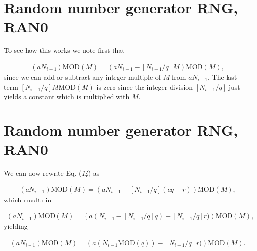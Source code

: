 \documentclass[letterpaper,10pt,english]{sphinxmanual}
\begin{document}
\section{Random number generator RNG, RAN0}
\label{\detokenize{chapter3:id10}}
To see how this works we note first that




\begin{equation*}
\begin{split}
\begin{equation}
(aN_{i-1}) \mathrm{MOD} (M)= (aN_{i-1}-[N_{i-1}/q]M)\mathrm{MOD} (M),
\label{eq:rntrick1} \tag{14}
\end{equation}
\end{split}
\end{equation*}
since we can add or subtract any integer multiple of \(M\) from \(aN_{i-1}\).
The last term \([N_{i-1}/q]M\mathrm{MOD}(M)\) is zero since the integer division
\([N_{i-1}/q]\) just yields a constant which is multiplied with \(M\).


\section{Random number generator RNG, RAN0}
\label{\detokenize{chapter3:id11}}
We can now rewrite Eq. ({\hyperref[\detokenize{chapter3:eq:rntrick1}]{\emph{14}}}) as




\begin{equation*}
\begin{split}
\begin{equation}
(aN_{i-1}) \mathrm{MOD} (M)= (aN_{i-1}-[N_{i-1}/q](aq+r))\mathrm{MOD} (M),
\label{eq:rntrick2} \tag{15}
\end{equation}
\end{split}
\end{equation*}
which results
in




\begin{equation*}
\begin{split}
\begin{equation}
(aN_{i-1}) \mathrm{MOD} (M)= \left(a(N_{i-1}-[N_{i-1}/q]q)-[N_{i-1}/q]r)\right)\mathrm{MOD} (M),
\label{eq:rntrick3} \tag{16}
\end{equation}
\end{split}
\end{equation*}
yielding




\begin{equation*}
\begin{split}
\begin{equation}
(aN_{i-1}) \mathrm{MOD} (M)= \left(a(N_{i-1}\mathrm{MOD} (q)) -[N_{i-1}/q]r)\right)\mathrm{MOD} (M).
\label{eq:rntrick4} \tag{17}
\end{equation}
\end{split}
\end{equation*}
\end{document}
